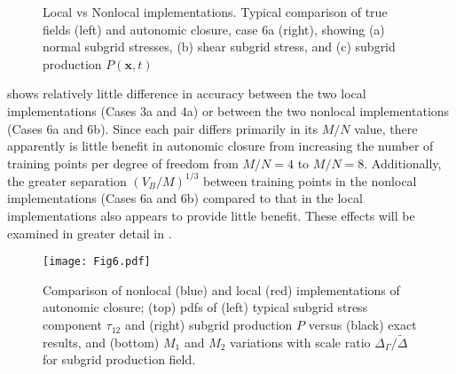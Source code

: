 %
\begin{figure}
	\centering %
	\label{F:CG24a}
\end{figure}
%
\begin{figure}
	\ContinuedFloat
	\centering %
	\label{F:CG24b}
\end{figure}
%
\begin{figure}
	\ContinuedFloat
	\centering %
	\label{F:CG24c}
\end{figure}
%
\begin{figure}
	\ContinuedFloat
	\caption{Local vs Nonlocal implementations. Typical comparison of  true fields (left) and autonomic closure, case 6a (right), showing (a) normal subgrid stresses, (b) shear subgrid stress, and (c) subgrid production $P(\mathbf{x},t)$}
	\label{F:CG24c}
\end{figure}
%
%

 shows relatively little difference in accuracy between the two local implementations (Cases 3a and 4a) or between the two nonlocal implementations (Cases 6a and 6b). Since each pair differs primarily in its  $M/N$ value, there apparently is little benefit in autonomic closure from increasing the number of training points per degree of freedom from  $M/N = 4$ to  $M/N = 8$. Additionally, the greater separation  $(V_B/M)^{1/3}$ between training points in the nonlocal implementations (Cases 6a and 6b) compared to that in the local implementations also appears to provide little benefit. These effects will be examined in greater detail in .

%
\begin{figure}
	\begin{center}
	\texttt{[image: Fig6.pdf]}
	\caption{ Comparison of nonlocal (blue) and local (red) implementations of autonomic closure; (top) pdfs of (left) typical subgrid stress component $\tau_{12}$ and (right) subgrid production $P$ versus (black) exact results, and (bottom) $M_1$ and $M_2$ variations with scale ratio $\Delta_{\Gamma}/\widetilde{\Delta}$ for subgrid production field. }
	\label{F:6}
	\end{center}
\end{figure}
%
%


